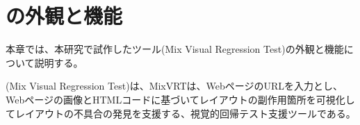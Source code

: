 \chapter{ \toolName の外観と機能}\label{cha:Function}
本章では、本研究で試作したツール\toolName (Mix Visual Regression Test)の外観と機能について説明する。
\par
\toolName (Mix Visual Regression Test)は、MixVRTは、WebページのURLを入力とし、Webページの画像とHTMLコードに基づいてレイアウトの副作用箇所を可視化してレイアウトの不具合の発見を支援する、視覚的回帰テスト支援ツールである。
\par

